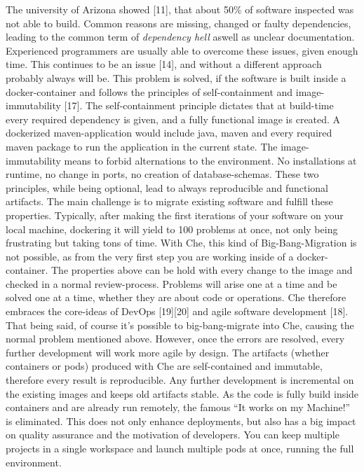 \documentclass[utf8,biblatex]{lni}
\begin{document}
The university of Arizona showed [11], that about 50\% of software inspected was not able to build. 
Common reasons are missing, changed or faulty dependencies, leading to the common term of \textit{dependency hell} aswell as unclear documentation. 
Experienced programmers are usually able to overcome these issues, given enough time. This continues to be an issue [14], and without a different approach probably always will be. 
This problem is solved, if the software is built inside a docker-container and follows the principles of self-containment and image-immutability [17].
The self-containment principle dictates that  at build-time every required dependency is given, and a fully functional image is created.
A dockerized maven-application would include java, maven and every required maven package to run the application in the current state. 
The image-immutability means to forbid alternations to the environment. 
No installations at runtime, no change in ports, no creation of database-schemas.
These two principles, while being optional, lead to always reproducible and functional artifacts.
The main challenge is to migrate existing software and fulfill these properties. 
Typically, after making the first iterations of your software on your local machine, dockering it will yield to 100 problems at once, not only being frustrating but taking tons of time. 
With Che, this kind of Big-Bang-Migration is not possible, as from the very first step you are working inside of a docker-container.
The properties above can be hold with every change to the image and checked in a normal review-process. 
Problems will arise one at a time and be solved one at a time, whether they are about code or operations. 
Che therefore embraces the core-ideas of DevOps [19][20] and agile software development [18].
That being said, of course it's possible to big-bang-migrate into Che, causing the normal problem mentioned above. 
However, once the errors are resolved, every further development will work more agile by design.
The artifacts (whether containers or pods) produced with Che are self-contained and immutable, therefore every result is reproducible. 
Any further development is incremental on the existing images and keeps old artifacts stable. 
As the code is fully build inside containers and are already run remotely, the famous “It works on my Machine!” is eliminated. 
This does not only enhance deployments, but also has a big impact on quality assurance and the motivation of developers. 
You can keep multiple projects in a single workspace and launch multiple pods at once, running the full environment. 
\end{document}
